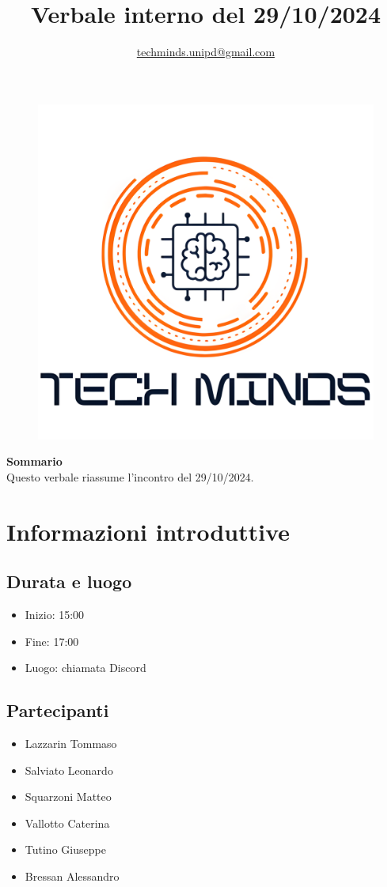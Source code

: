 \documentclass[10pt]{article}
\title{\textbf{Verbale interno del 29/10/2024}}
\author{\href{mailto:techminds.unipd@gmail.com}{techminds.unipd@gmail.com}}
\date{}
\begin{document}
\begin{figure}
    \centering
    \includegraphics[width=0.8\linewidth]{../../../../assets/logo_upscaled.png}
\end{figure}
\maketitle
\begin{center}

  \textbf{Sommario}\\
  \vspace{3mm}
  Questo verbale riassume l'incontro del 29/10/2024.
\end{center}
\newpage
\tableofcontents{\newpage}

\section{Informazioni introduttive}
\subsection{Durata e luogo}
\begin{itemize}
  \item Inizio: 15:00
  \item Fine: 17:00
  \item Luogo: chiamata Discord
\end{itemize}
\subsection{Partecipanti}
\begin{itemize}
  \item Lazzarin Tommaso
  \item Salviato Leonardo
  \item Squarzoni Matteo
  \item Vallotto Caterina
  \item Tutino Giuseppe
  \item Bressan Alessandro
\end{itemize}
\end{document}
